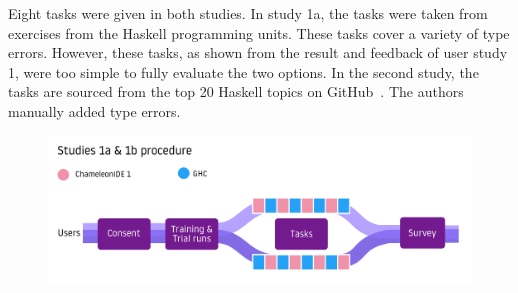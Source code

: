 Eight tasks were given in both studies. In study 1a, the tasks were taken from exercises from the Haskell programming units. These tasks cover a variety of type errors. However, these tasks, as shown from the result and feedback of user study 1, were too simple to fully evaluate the two options. In the second study, the tasks are sourced from the top 20 Haskell topics on GitHub~\cite{github_github_2022}. The authors manually added type errors. 

\begin{figure}[h]
    \centering
    \includegraphics[width=\linewidth]{images/procedure-1.pdf}
    \caption{}
    \label{fig:procedure-1}
\end{figure}




